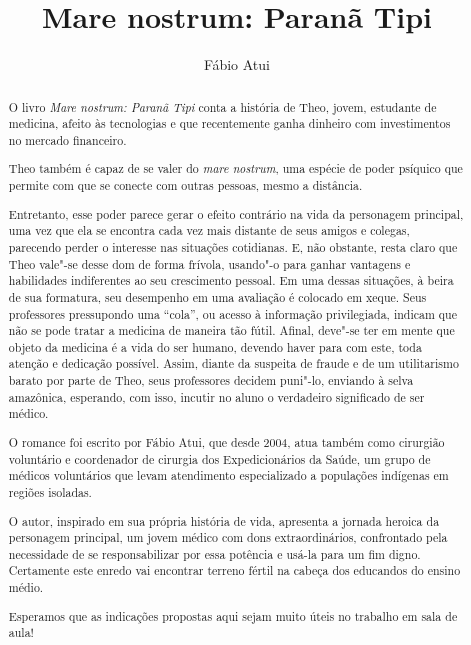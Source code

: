\documentclass[12pt]{extarticle}
\begin{document}
\newcommand{\AutorLivro}{Fábio Atui}
\newcommand{\TituloLivro}{Mare nostrum: Paranã Tipi}
\newcommand{\Tema}{Ficção, mistério e fantasia}
\newcommand{\Genero}{Romance}
\newcommand{\imagemCapa}{./images/PNLD0008-01.png}
\newcommand{\issnppub}{---}
\newcommand{\issnepub}{---}
\newcommand{\colaborador}{\textbf{Bruno Gradella e Vicente Castro} é uma pessoa incrível e vai fazer um bom serviço.}


\title{\TituloLivro}
\author{\AutorLivro}
\def\authornotes{\colaborador}

\date{}
\maketitle

\baselineskip\par
\begin{abstract}

O livro \textit{Mare nostrum: Paranã Tipi} conta a história de Theo, jovem, estudante de medicina,
afeito às tecnologias e que recentemente ganha dinheiro com 
investimentos no mercado financeiro.

Theo também é capaz de se valer do \emph{mare nostrum}, uma espécie de
poder psíquico que permite com que se conecte com outras pessoas, mesmo
a distância.

Entretanto, esse poder parece gerar o efeito contrário na vida da
personagem principal, uma vez que ela se encontra cada vez mais distante
de seus amigos e colegas, parecendo perder o interesse nas situações
cotidianas. E, não obstante, resta claro que Theo vale"-se desse dom de
forma frívola, usando"-o para ganhar vantagens e habilidades indiferentes
ao seu crescimento pessoal. Em uma dessas situações, à beira de sua
formatura, seu desempenho em uma avaliação é colocado em xeque. Seus
professores pressupondo uma ``cola'', ou acesso à informação
privilegiada, indicam que não se pode tratar a medicina de maneira tão
fútil. Afinal,  deve"-se ter em mente que  objeto da medicina é
a vida do ser humano, devendo haver para com este, toda atenção e dedicação
possível. Assim, diante da suspeita de fraude e de um utilitarismo
barato por parte de Theo, seus professores decidem puni"-lo, enviando à
selva amazônica, esperando, com isso, incutir no aluno o verdadeiro
significado de ser médico.

O romance foi escrito por Fábio Atui, que desde 2004, atua também como cirurgião voluntário e coordenador de cirurgia dos Expedicionários da Saúde, um grupo de médicos voluntários que levam atendimento especializado a populações indígenas em regiões isoladas. 

O autor, inspirado em sua própria história de vida, apresenta a jornada 
heroica da personagem principal, um jovem médico com dons extraordinários,
confrontado pela necessidade de se responsabilizar por essa potência e 
usá-la para um fim digno. Certamente este enredo vai encontrar terreno 
fértil na cabeça dos educandos do ensino médio. 

Esperamos que as indicações propostas aqui sejam muito úteis no trabalho 
em sala de aula!
\end{abstract}
\end{document}
